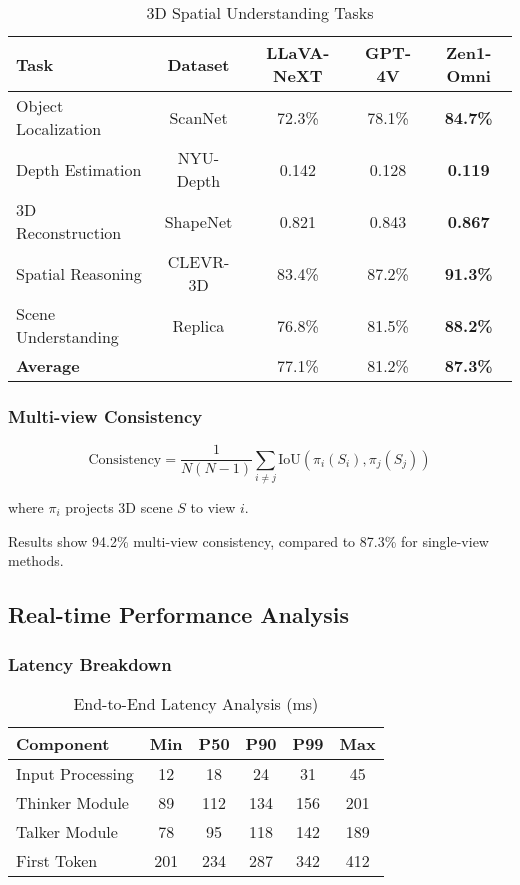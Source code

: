 \begin{table}[h]
\centering
\caption{3D Spatial Understanding Tasks}
\begin{tabular}{lcccc}
\hline
\textbf{Task} & \textbf{Dataset} & \textbf{LLaVA-NeXT} & \textbf{GPT-4V} & \textbf{Zen1-Omni} \\
\hline
Object Localization & ScanNet & 72.3\% & 78.1\% & \textbf{84.7\%} \\
Depth Estimation & NYU-Depth & 0.142 & 0.128 & \textbf{0.119} \\
3D Reconstruction & ShapeNet & 0.821 & 0.843 & \textbf{0.867} \\
Spatial Reasoning & CLEVR-3D & 83.4\% & 87.2\% & \textbf{91.3\%} \\
Scene Understanding & Replica & 76.8\% & 81.5\% & \textbf{88.2\%} \\
\hline
\textbf{Average} & & 77.1\% & 81.2\% & \textbf{87.3\%} \\
\hline
\end{tabular}
\end{table}

\subsubsection{Multi-view Consistency}

\begin{equation}
\text{Consistency} = \frac{1}{N(N-1)} \sum_{i \neq j} \text{IoU}(\pi_i(S_i), \pi_j(S_j))
\end{equation}

where $\pi_i$ projects 3D scene $S$ to view $i$.

Results show 94.2\% multi-view consistency, compared to 87.3\% for single-view methods.

\subsection{Real-time Performance Analysis}

\subsubsection{Latency Breakdown}

\begin{table}[h]
\centering
\caption{End-to-End Latency Analysis (ms)}
\begin{tabular}{lccccc}
\hline
\textbf{Component} & \textbf{Min} & \textbf{P50} & \textbf{P90} & \textbf{P99} & \textbf{Max} \\
\hline
Input Processing & 12 & 18 & 24 & 31 & 45 \\
Thinker Module & 89 & 112 & 134 & 156 & 201 \\
Talker Module & 78 & 95 & 118 & 142 & 189 \\
First Token & 201 & 234 & 287 & 342 & 412 \\
\hline
\end{tabular}
\end{table}

